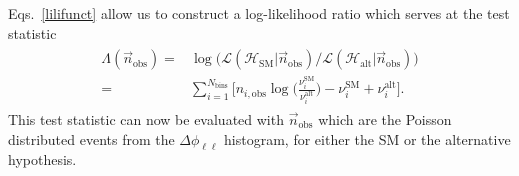 \documentclass[preprint]{JHEP3}
\newcommand{\mrm}{\mathrm}
\newcommand{\SM}{\mathrm{SM}}
\newcommand{\alt}{\mathrm{alt}}
\def\HSM{\mathcal{H}_{\mathrm{SM}}}
\def\Halt{\mathcal{H}_{\mathrm{alt}}}
\newcommand{\be}{\begin{eqnarray}}
\newcommand{\ee}{\end{eqnarray}}
\begin{document}
Eqs.~\ref{lilifunct} allow us to construct a log-likelihood ratio which serves at the test statistic
\be
\begin{split}
  \Lambda(\vec{n}_\mathrm{obs}) =& \log \biggl( \mathcal{L}(\HSM |\vec{n}_\mathrm{obs})  \big/ \mathcal{L}(\Halt|\vec{n}_\mathrm{obs})  \biggr)  \\
                                =& \sum_{i=1}^{N_\mathrm{bins}} \biggl[ n_{i,\mathrm{obs}}\log \biggl( \frac{\nu_i^{\SM}}{\nu_i^{\alt}} \biggr) -\nu_i^{\SM} + \nu_i^{\alt} \biggr].
\end{split}
\ee
This test statistic can now be evaluated with $\vec{n}_{\mrm{obs}}$ which are the Poisson distributed events from the  
$\Delta \phi_{\ell\ell}$ histogram, for either the SM or the alternative hypothesis.
\end{document}
